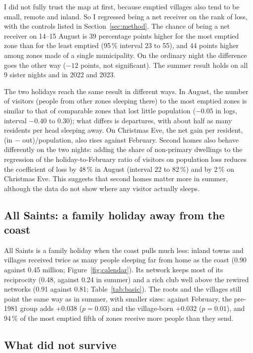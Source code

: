 I did not fully trust the map at first, because emptied villages also tend to be small, remote and inland. So I regressed being a net receiver on the rank of loss, with the controls listed in Section~\ref{sec:method}. The chance of being a net receiver on 14--15 August is 39 percentage points higher for the most emptied zone than for the least emptied (95\,\% interval 23 to 55), and 44 points higher among zones made of a single municipality. On the ordinary night the difference goes the other way ($-12$ points, not significant). The summer result holds on all 9 sister nights and in 2022 and 2023.

The two holidays reach the same result in different ways. In August, the number of visitors (people from other zones sleeping there) to the most emptied zones is similar to that of comparable zones that lost little population ($-0.05$ in logs, interval $-0.40$ to $0.30$); what differs is departures, with about half as many residents per head sleeping away. On Christmas Eve, the net gain per resident, (in $-$ out)/population, also rises against February. Second homes also behave differently on the two nights: adding the share of non-primary dwellings to the regression of the holiday-to-February ratio of visitors on population loss reduces the coefficient of loss by 48\,\% in August (interval 22 to 82\,\%) and by 2\,\% on Christmas Eve. This suggests that second homes matter more in summer, although the data do not show where any visitor actually sleeps.

\subsection{All Saints: a family holiday away from the coast}\label{sec:res-allsaints}

All Saints is a family holiday when the coast pulls much less: inland towns and villages received twice as many people sleeping far from home as the coast (0.90 against 0.45 million; Figure~\ref{fig:calendar}). Its network keeps most of its reciprocity (0.48, against 0.24 in summer) and a rich club well above the rewired networks (0.91 against 0.81; Table~\ref{tab:basic}). The roots and the villages still point the same way as in summer, with smaller sizes: against February, the pre-1981 group adds $+0.038$ ($p=0.03$) and the village-born $+0.032$ ($p=0.01$), and 94\,\% of the most emptied fifth of zones receive more people than they send.

\subsection{What did not survive}\label{sec:res-failed}

